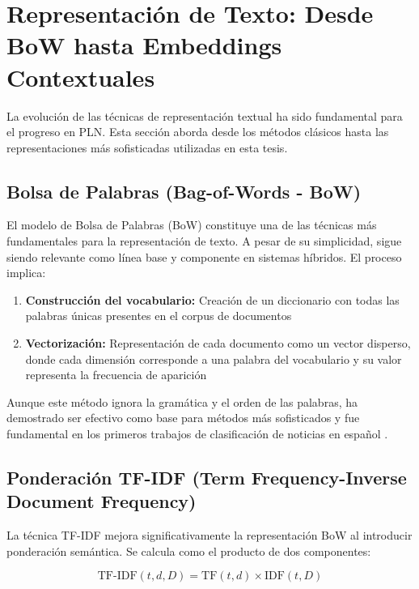 \section{Representación de Texto: Desde BoW hasta Embeddings Contextuales}
\label{sec:representacion_texto}

La evolución de las técnicas de representación textual ha sido fundamental para el progreso en PLN. Esta sección aborda desde los métodos clásicos hasta las representaciones más sofisticadas utilizadas en esta tesis.

\subsection{Bolsa de Palabras (Bag-of-Words - BoW)}

El modelo de Bolsa de Palabras (BoW) constituye una de las técnicas más fundamentales para la representación de texto. A pesar de su simplicidad, sigue siendo relevante como línea base y componente en sistemas híbridos. El proceso implica:

\begin{enumerate}
    \item \textbf{Construcción del vocabulario:} Creación de un diccionario con todas las palabras únicas presentes en el corpus de documentos
    \item \textbf{Vectorización:} Representación de cada documento como un vector disperso, donde cada dimensión corresponde a una palabra del vocabulario y su valor representa la frecuencia de aparición
\end{enumerate}

Aunque este método ignora la gramática y el orden de las palabras, ha demostrado ser efectivo como base para métodos más sofisticados y fue fundamental en los primeros trabajos de clasificación de noticias en español \cite{acosta2019construccion}.

\subsection{Ponderación TF-IDF (Term Frequency-Inverse Document Frequency)}

La técnica TF-IDF mejora significativamente la representación BoW al introducir ponderación semántica. Se calcula como el producto de dos componentes:

\begin{equation}
\text{TF-IDF}(t,d,D) = \text{TF}(t,d) \times \text{IDF}(t,D)
\end{equation}

